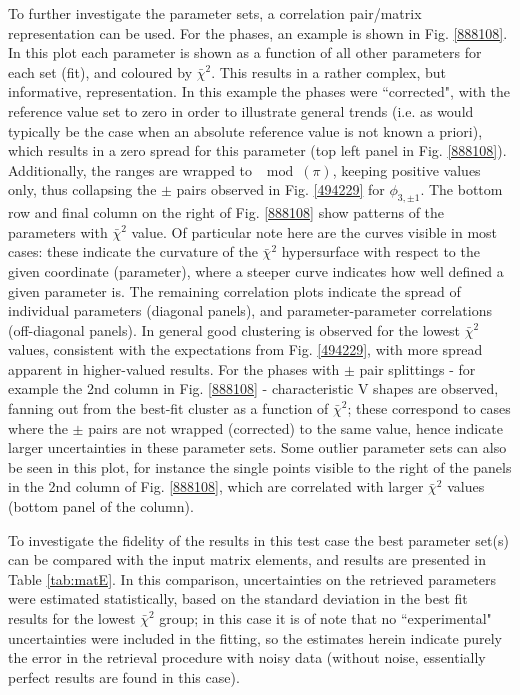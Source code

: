 \documentclass[10pt]{article}
\begin{document}

To further investigate the parameter sets, a correlation pair/matrix representation can be used. For the phases, an example is shown in Fig. \ref{888108}. In this plot each parameter is shown as a function of all other parameters for each set (fit), and coloured by $\bar{\chi}^2$. This results in a rather complex, but informative, representation. In this example the phases were ``corrected", with the reference value set to zero in order to illustrate general trends (i.e. as would typically be the case when an absolute reference value is not known a priori), which results in a zero spread for this parameter (top left panel in Fig. \ref{888108}). Additionally, the ranges are wrapped to $\mod(\pi)$, keeping positive values only, thus collapsing the $\pm$ pairs observed in Fig. \ref{494229} for $\phi_{3,\pm1}$. The bottom row and final column on the right of Fig. \ref{888108} show patterns of the parameters with $\bar{\chi}^2$ value. Of particular note here are the curves visible in most cases: these indicate the curvature of the $\bar{\chi}^2$ hypersurface with respect to the given coordinate (parameter), where a steeper curve indicates how well defined a given parameter is. The remaining correlation plots indicate the spread of individual parameters (diagonal panels), and parameter-parameter correlations (off-diagonal panels). In general good clustering is observed for the lowest $\bar{\chi}^2$ values, %
consistent with the expectations from Fig. \ref{494229}, with more spread apparent in higher-valued results. For the phases with $\pm$ pair splittings - for example the 2nd column in Fig. \ref{888108} - characteristic V shapes are observed, fanning out from the best-fit cluster as a function of $\bar{\chi}^2$; these correspond to cases where the $\pm$ pairs are not wrapped (corrected) to the same value, hence indicate larger uncertainties in these parameter sets. Some outlier parameter sets can also be seen in this plot, for instance the single points visible to the right of the panels in the 2nd column of Fig. \ref{888108}, which are correlated with larger $\bar{\chi}^2$ values (bottom panel of the column).

To investigate the fidelity of the results in this test case the best parameter set(s) can be compared with the input matrix elements, and results are presented in Table \ref{tab:matE}. In this comparison, uncertainties on the retrieved parameters were estimated statistically, based on the standard deviation in the best fit results for the lowest $\bar{\chi}^2$ group; in this case it is of note that no ``experimental" uncertainties were included in the fitting, so the estimates herein indicate purely the error in the retrieval procedure with noisy data (without noise, essentially perfect results are found in this case). 
\end{document}
